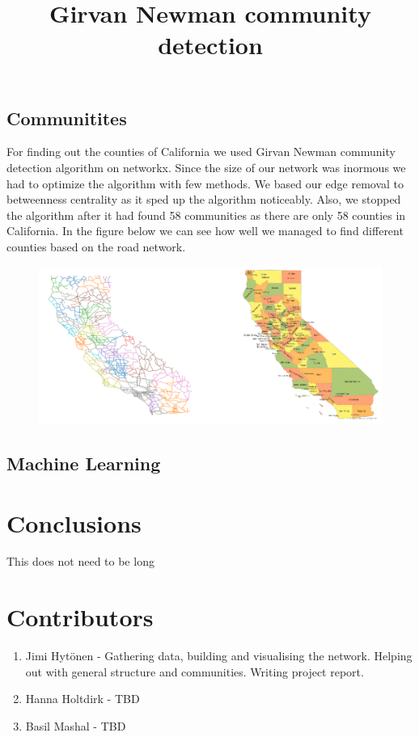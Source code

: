 \documentclass[11pt]{article}
\begin{document}
\subsection{Communitites}
For finding out the counties of California we used Girvan Newman community detection algorithm on networkx. Since the size of our network was inormous we had to optimize the algorithm with few methods. We based our edge removal to betweenness centrality as it sped up the algorithm noticeably. Also, we stopped the algorithm after it had found 58 communities as there are only 58 counties in California. In the figure below we can see how well we managed to find different counties based on the road network. 

\begin{figure}[h!]
\title{Girvan Newman community detection}
\centering
\includegraphics[scale=0.4]{community.png}
\end{figure}

\subsection{Machine Learning}


\newpage
\section{Conclusions}
This does not need to be long


\section{Contributors}

\begin{enumerate}
    \item Jimi Hytönen - Gathering data, building and visualising the network. Helping out with general structure and communities. Writing project report.
	\item Hanna Holtdirk - TBD
	\item Basil Mashal - TBD

\end{enumerate}
\end{document}
